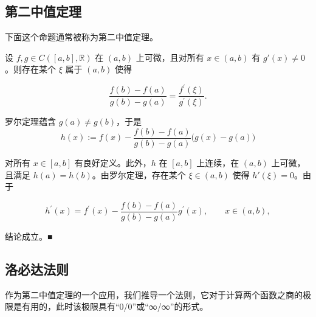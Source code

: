\subsection*{第二中值定理}

下面这个命题通常被称为第二中值定理。

\begin{proposition}

设 $ f, g \in C([a, b], \mathbb{R}) $ 在 $ (a, b) $ 上可微，且对所有 $ x \in (a, b) $ 有 $ g'(x) \neq 0 $。则存在某个 $ \xi $ 属于 $ (a, b) $ 使得

\[
\frac{f(b)-f(a)}{g(b)-g(a)}=\frac{f^{\prime}(\xi)}{g^{\prime}(\xi)}.
\]

\proofhead
罗尔定理蕴含 $ g(a) \neq g(b) $，于是
\[
h(x):=f(x)-\frac{f(b)-f(a)}{g(b)-g(a)}\big(g(x)-g(a)\big)
\]

对所有 $x \in [a,b]$ 有良好定义。此外，$h$ 在 $[a,b]$ 上连续，在 $(a,b)$ 上可微，且满足 $h(a) = h(b)$。由罗尔定理，存在某个 $\xi \in (a,b)$ 使得 $h'(\xi) = 0$。由于

\[
h^{\prime}(x)=f^{\prime}(x)-\frac{f(b)-f(a)}{g(b)-g(a)}g^{\prime}(x),\qquad x\in(a,b),
\]

结论成立。■

\end{proposition}

\subsection*{洛必达法则}

作为第二中值定理的一个应用，我们推导一个法则，它对于计算两个函数之商的极限是有用的，此时该极限具有“0/0”或“∞/∞”的形式。

